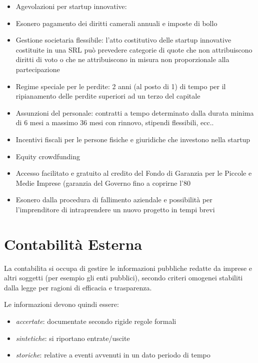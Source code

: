 \documentclass[10pt,a4paper,fleqn,oneside]{book}
\begin{document}
\begin{itemize}
    \item Agevolazioni per startup innovative:
    \item Esonero pagamento dei diritti camerali annuali e imposte di bollo
    \item Gestione societaria flessibile: l’atto costitutivo delle startup innovative costituite in
    una SRL può prevedere categorie di quote che non attribuiscono diritti di voto o che ne
    attribuiscono in misura non proporzionale alla partecipazione
    \item Regime speciale per le perdite: 2 anni (al posto di 1) di tempo per il ripianamento
    delle perdite superiori ad un terzo del capitale
    \item Assunzioni del personale: contratti a tempo determinato dalla durata minima di 6
    mesi a massimo 36 mesi con rinnovo, stipendi flessibili, ecc..
    \item Incentivi fiscali per le persone fisiche e giuridiche che investono nella startup
    \item Equity crowdfunding
    \item Accesso facilitato e gratuito al credito del Fondo di Garanzia per le Piccole e Medie
    Imprese (garanzia del Governo fino a coprirne l'80%
    \item Esonero dalla procedura di fallimento aziendale e possibilità per l'imprenditore di
    intraprendere un nuovo progetto in tempi brevi
\end{itemize}

\chapter{Contabilità Esterna}
La \gls{contabilita} si occupa di gestire le informazioni pubbliche redatte da 
imprese e altri soggetti (per esempio gli enti pubblici), secondo criteri omogenei 
stabiliti dalla legge per ragioni di efficacia e trasparenza.

Le informazioni devono quindi essere:
\begin{itemize}
    \item \emph{accertate}: documentate secondo rigide regole formali
    \item \emph{sintetiche}: si riportano entrate/uscite
    \item \emph{storiche}: relative a eventi avvenuti in un dato periodo di tempo
\end{itemize}
\end{document}
